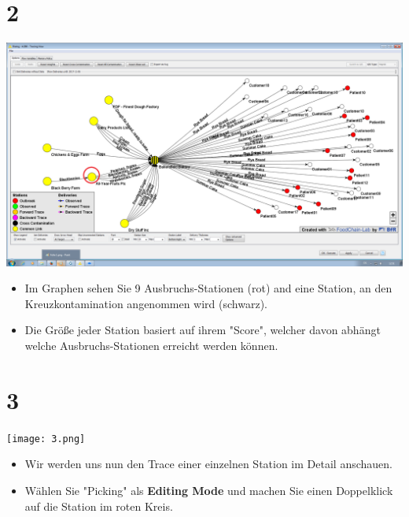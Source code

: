 \documentclass{beamer}
\begin{document}
\section{2}
\begin{frame}
	\begin{center}
  		\includegraphics[height=0.6\textheight]{2.png}
	\end{center}
	\begin{itemize}
		\item Im Graphen sehen Sie 9 Ausbruchs-Stationen (rot) and eine Station, an den Kreuzkontamination angenommen wird (schwarz).
		\item Die Größe jeder Station basiert auf ihrem "Score", welcher davon abhängt welche Ausbruchs-Stationen erreicht werden können.
	\end{itemize}
\end{frame}

\section{3}
\begin{frame}
	\begin{center}
  		\texttt{[image: 3.png]}
	\end{center}
	\begin{itemize}
		\item Wir werden uns nun den Trace einer einzelnen Station im Detail anschauen.
		\item Wählen Sie "Picking" als \textbf{Editing Mode} und machen Sie einen Doppelklick auf die Station im roten Kreis.
	\end{itemize}
\end{frame}
\end{document}
